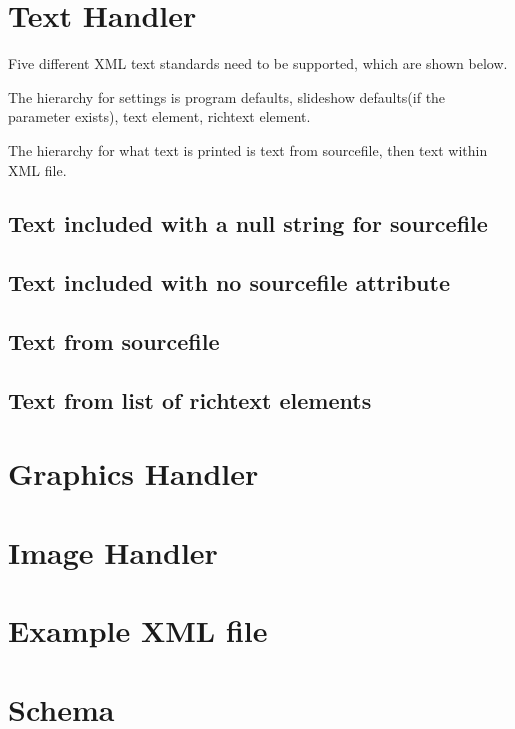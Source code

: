\documentclass{article}
\begin{document}
\clearpage
\section{Text Handler}
Five different XML text standards need to be supported, which are shown below.

The hierarchy for settings is program defaults, slideshow defaults(if the parameter exists), text element, richtext element.

The hierarchy for what text is printed is text from sourcefile, then text within XML file.
\subsection{Text included with a null string for sourcefile}
\lstset{language=XML}


\subsection{Text included with no sourcefile attribute}


\subsection{Text from sourcefile}


\subsection{Text from list of richtext elements}

	
\clearpage

\section{Graphics Handler}
\clearpage

\section{Image Handler}
\clearpage


\section{Example XML file}
\small
\lstset{language=XML}


\clearpage

\section{Schema}
\lstset{language=XML}

\end{document}
